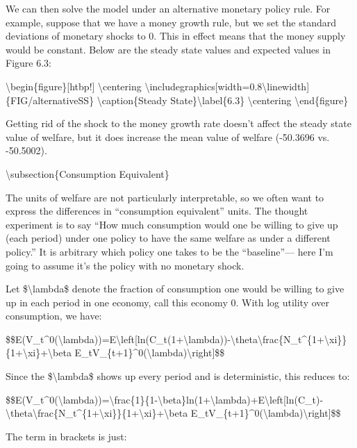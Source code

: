 \documentclass[10pt,math=newtx,citestyle=gb7714-2015,bibstyle=gb7714-2015]{elegantbook}
\begin{document}
	We can then solve the model under an alternative monetary policy rule. For example, suppose that we have a money growth rule, but we set the standard deviations of monetary shocks to 0. This in effect means that the money supply would be constant. Below are the steady state values and expected values in Figure 6.3:
	
	\textbackslash{}begin\{figure\}[htbp!]
	\textbackslash{}centering
	\textbackslash{}includegraphics[width=0.8\textbackslash{}linewidth]\{FIG/alternativeSS\}
	\textbackslash{}caption\{Steady State\}\textbackslash{}label\{6.3\}
	\textbackslash{}centering
	\textbackslash{}end\{figure\}
	
	Getting rid of the shock to the money growth rate doesn't affect the steady state value of welfare, but it does increase the mean value of welfare (-50.3696 vs. -50.5002).
	
	\textbackslash{}subsection\{Consumption Equivalent\}
	
	The units of welfare are not particularly interpretable, so we often want to express the differences in ``consumption equivalent'' units. The thought experiment is to say ``How much consumption would one be willing to give up (each period) under one policy to have the same welfare as under a different policy.'' It is arbitrary which policy one takes to be the ``baseline''--- here I'm going to assume it's the policy with no monetary shock.
	
	Let \$\textbackslash{}lambda\$ denote the fraction of consumption one would be willing to give up in each period in one economy, call this economy 0. With log utility over consumption, we have:
	
	\$\$E(V\_t\^{}0(\textbackslash{}lambda))=E\textbackslash{}left[ln(C\_t(1+\textbackslash{}lambda))-\textbackslash{}theta\textbackslash{}frac\{N\_t\^{}\{1+\textbackslash{}xi\}\}\{1+\textbackslash{}xi\}+\textbackslash{}beta E\_tV\_\{t+1\}\^{}0(\textbackslash{}lambda)\textbackslash{}right]\$\$
	
	Since the \$\textbackslash{}lambda\$ shows up every period and is deterministic, this reduces to:
	
	\$\$E(V\_t\^{}0(\textbackslash{}lambda))=\textbackslash{}frac\{1\}\{1-\textbackslash{}beta\}ln(1+\textbackslash{}lambda)+E\textbackslash{}left[ln(C\_t)-\textbackslash{}theta\textbackslash{}frac\{N\_t\^{}\{1+\textbackslash{}xi\}\}\{1+\textbackslash{}xi\}+\textbackslash{}beta E\_tV\_\{t+1\}\^{}0(\textbackslash{}lambda)\textbackslash{}right]\$\$
	
	The term in brackets is just:
	
\end{document}
